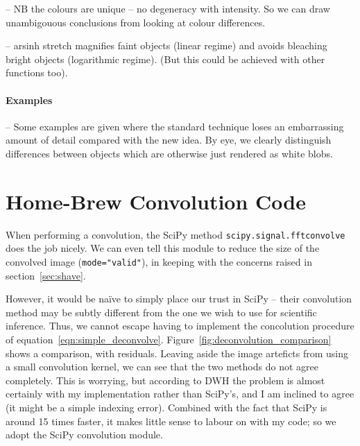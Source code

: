 \documentclass[letterpaper, 11pt]{article}
\begin{document}
-- NB the colours are unique -- no degeneracy with intensity. So we can draw unambigouous conclusions from looking at colour differences.

-- arsinh stretch magnifies faint objects (linear regime) and avoids bleaching bright objects (logarithmic regime). (But this could be achieved with other functions too).


\paragraph{Examples}

-- Some examples are given where the standard technique loses an embarrassing amount of detail compared with the new idea. By eye, we clearly distinguish differences between objects which are otherwise just rendered as white blobs.




\section{Home-Brew Convolution Code}

When performing a convolution, the SciPy method \texttt{scipy.signal.fftconvolve} does the job nicely. We can even tell this module to reduce the size of the convolved image (\texttt{mode="valid"}), in keeping with the concerns raised in section~\ref{sec:shave}.

However, it would be na\"ive to simply place our trust in SciPy -- their convolution method may be subtly different from the one we wish to use for scientific inference. Thus, we cannot escape having to implement the concolution procedure of equation~\ref{eqn:simple_deconvolve}. Figure~\vref{fig:deconvolution_comparison} shows a comparison, with residuals. Leaving aside the image arteficts from using a small convolution kernel, we can see that the two methods do not agree completely. This is worrying, but according to DWH the problem is almost certainly with my implementation rather than SciPy's, and I am inclined to agree (it might be a simple indexing error). Combined with the fact that SciPy is around 15 times faster, it makes little sense to labour on with my code; so we adopt the SciPy convolution module.
\end{document}
